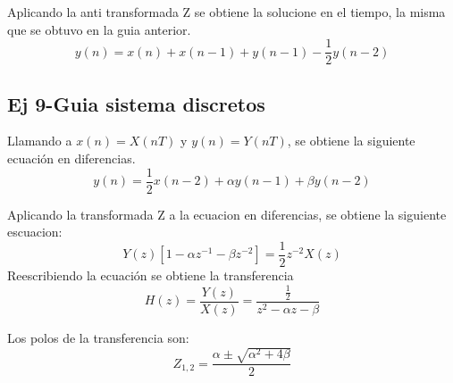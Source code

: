 \documentclass[../../guia1.tex]{subfiles}
\begin{document}
Aplicando la anti transformada Z se obtiene la solucione en el tiempo, la misma que se obtuvo en la guia anterior.
\begin{equation}
y(n)=x(n)+x(n-1)+y(n-1)-\frac{1}{2}y(n-2)
\end{equation}

\subsection*{Ej 9-Guia sistema discretos}
Llamando a $x(n)=X(nT)$ y $y(n)=Y(nT)$, se obtiene la siguiente ecuación en diferencias. 
\begin{equation}
y(n)=\frac{1}{2} x(n-2) + \alpha y(n-1) + \beta y(n-2)  
\end{equation}

Aplicando la transformada Z a la ecuacion en diferencias, se obtiene la siguiente escuacion:
\begin{equation}
Y(z)\left[ 1 - \alpha z^{-1} - \beta z^{-2} \right] = \frac{1}{2} z^{-2} X(z)
\end{equation}
Reescribiendo la ecuación se obtiene la transferencia
\begin{equation}
H(z)=\frac{Y(z)}{X(z)}=\frac{\frac{1}{2}}{z^{2} - \alpha z - \beta }
\end{equation}

Los polos de la transferencia son:
\begin{equation}
Z_{1,2}=\frac{\alpha \pm \sqrt{\alpha ^ 2 + 4 \beta}  }{2}
\end{equation}
\end{document}
